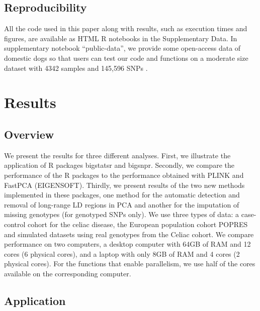\documentclass{bioinfo}
\begin{document}
\begin{methods}
\subsection{Reproducibility}

All the code used in this paper along with results, such as execution times and figures, are available as HTML R notebooks in the Supplementary Data. 
{\color{red}
In supplementary notebook ``public-data'', we provide some open-access data of domestic dogs so that users can test our code and functions on a moderate size dataset with 4342 samples and 145,596 SNPs \cite[]{hayward2016complex}.
}

\end{methods}

\section{Results}

\subsection{Overview}\label{sec:overview}

We present the results for three different analyses. First, we illustrate the application of R packages bigstatsr and bigsnpr. Secondly, we compare the performance of the R packages to the performance obtained with PLINK and FastPCA (EIGENSOFT). Thirdly, we present results of the two new methods implemented in these packages, one method for the automatic detection and removal of long-range LD regions in PCA and another for the imputation of missing genotypes {\color{red} (for genotyped SNPs only)}. We use three types of data: a case-control cohort for the celiac disease, the European population cohort POPRES and simulated datasets using real genotypes from the Celiac cohort. We compare performance on two computers, a desktop computer with 64GB of RAM and 12 cores (6 physical cores), and a laptop with only 8GB of RAM and 4 cores (2 physical cores). For the functions that enable parallelism, we use half of the cores available on the corresponding computer.

\subsection{Application}
 
\end{document}
